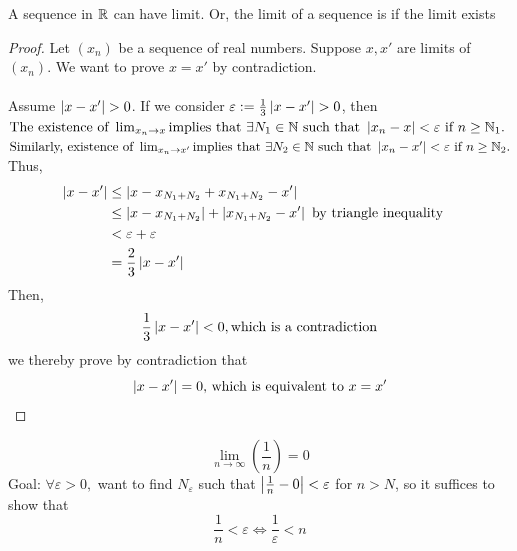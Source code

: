 \documentclass[a4paper,12pt]{article}
\begin{document}
\newpage
\begin{theorem}
    A sequence in $\mathbb{R}$ can have  limit. Or, the limit of a sequence is  if the limit exists 
\end{theorem}
\begin{proof}
    Let \((x_n)\) be a sequence of real numbers. Suppose \(x,x'\) are limits of \((x_n)\). We want to prove \(x = x'\) by contradiction.
    \\\\Assume \(\left\lvert x-x'\right\rvert > 0\). If we consider \(\varepsilon := \frac{1}{3}\left\lvert x-x'\right\rvert>0\), then\\
    \indent \(\text{The existence of } \lim_{x_n \to x}\text{implies that } \exists N_1 \in \mathbb{N} \text{ such that } \left\lvert x_n-x\right\rvert < \varepsilon\text{ if }n\ge \mathbb{N}_1. \)\\
    \indent \(\text{Similarly, existence of } \lim_{x_n \to x'} \text{implies that } \exists N_2 \in \mathbb{N} \text{ such that } \left\lvert x_n-x'\right\rvert < \varepsilon\text{ if }n\ge \mathbb{N}_2. \)\\
    Thus,
    \begin{align*}
        \left\lvert x-x'\right\rvert & \le \left\lvert x-x_{N_1+N_2}+x_{N_1+N_2}-x'\right\rvert & \\
                   & \le \left\lvert x-x_{N_1+N_2}\right\rvert+\left\lvert x_{N_1+N_2}-x'\right\rvert \text{ by triangle inequality}\\
                   & < \varepsilon+\varepsilon \\
                   & = \frac{2}{3}\left\lvert x-x'\right\rvert
    \end{align*}
    Then, 
    \[\frac{1}{3}\left\lvert x-x'\right\rvert<0,\text{which is a contradiction}\]
    we thereby prove by contradiction that
    \[\left\lvert x-x'\right\rvert = 0\text{, which is equivalent to } x=x'\]
\end{proof}

\begin{example}
    \[\lim_{n\to \infty}(\frac{1}{n}) = 0\]
    Goal: \(\forall \varepsilon>0,\) want to find \(N_\varepsilon\) such that \(\left\lvert \frac{1}{n}-0\right\rvert < \varepsilon\) for \(n>N\), 
    so it suffices to show that \\
    \[\frac{1}{n}<\varepsilon \Leftrightarrow \frac{1}{\varepsilon} < n\]
\end{example}
\end{document}
